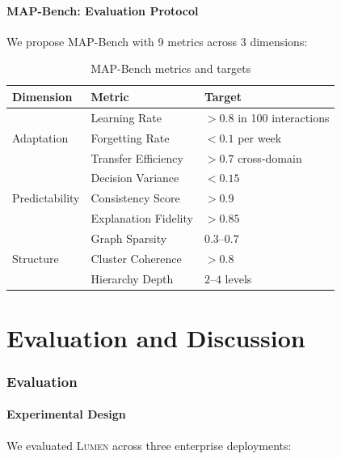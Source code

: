 \documentclass[11pt,a4paper]{article}
\theoremstyle{definition}
\theoremstyle{remark}
\newcommand{\lumen}{\textsc{Lumen}\xspace}
\begin{document}
\subsection{MAP-Bench: Evaluation Protocol}

We propose MAP-Bench with 9 metrics across 3 dimensions:

\begin{table}[H]
\centering
\begin{tabular}{lll}
\toprule
\textbf{Dimension} & \textbf{Metric} & \textbf{Target} \\
\midrule
\multirow{3}{*}{Adaptation}
    & Learning Rate & $> 0.8$ in 100 interactions \\
    & Forgetting Rate & $< 0.1$ per week \\
    & Transfer Efficiency & $> 0.7$ cross-domain \\
\midrule
\multirow{3}{*}{Predictability}
    & Decision Variance & $< 0.15$ \\
    & Consistency Score & $> 0.9$ \\
    & Explanation Fidelity & $> 0.85$ \\
\midrule
\multirow{3}{*}{Structure}
    & Graph Sparsity & $0.3$--$0.7$ \\
    & Cluster Coherence & $> 0.8$ \\
    & Hierarchy Depth & $2$--$4$ levels \\
\bottomrule
\end{tabular}
\caption{MAP-Bench metrics and targets}
\label{tab:map-bench}
\end{table}


\part{Evaluation and Discussion}

\section{Evaluation}
\label{sec:evaluation}

\subsection{Experimental Design}

We evaluated \lumen across three enterprise deployments:
\end{document}
